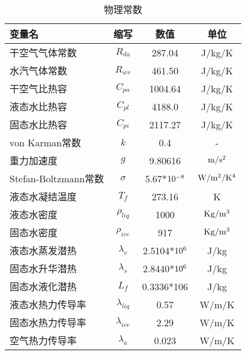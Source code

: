 \begin{table}[]
\centering
\caption{物理常数}
\label{tab:物理常数}
\begin{tabular}{lccc}
\toprule
变量名&缩写&数值&单位 \\\midrule
干空气气体常数            & $R_{da}$                       & 287.04     & J/kg/K  \\ 
水汽气体常数             & $R_{wv}$                       & 461.50     & J/kg/K  \\
干空气比热容             & $C_{pa} $                      & 1004.64    & J/kg/K  \\
液态水比热容             & $C_{pl}$                       & 4188.0     & J/kg/K  \\
固态水比热容             & $C_{pi}$                       & 2117.27    & J/kg/K  \\
von Karman常数       & $k$                               & 0.4        &    -     \\
重力加速度              & $g$                               & 9.80616    & $\rm m/s^2$    \\
Stefan-Boltzmann常数 & $\sigma$           & 5.67*$\rm 10^{-8}$  & $\rm W/m^2/K^4$ \\
液态水凝结温度            & $T_f$                            & 273.16     & K       \\
液态水密度              & $\rho_{liq}$    & 1000       & $\rm Kg/m^3$   \\
固态水密度              & $\rho_{ice}$    & 917        & $\rm Kg/m^3$   \\
液态水蒸发潜热            & $\lambda_v$       & 2.5104*$\rm 10^{6}$ & J/kg    \\
固态水升华潜热            & $\lambda_s$       & 2.8440*$\rm 10^{6}$ & J/kg    \\
固态水液化潜热            & $L_f$                           & 0.3336*106 & J/kg    \\
液态水热力传导率           & $\lambda_{liq}$ & 0.57       & W/m/K   \\
固态水热力传导率           & $\lambda_{ice}$ & 2.29       & W/m/K   \\
空气热力传导率            & $\lambda_a$       & 0.023      & W/m/K      \\\bottomrule
\end{tabular}
\end{table}



